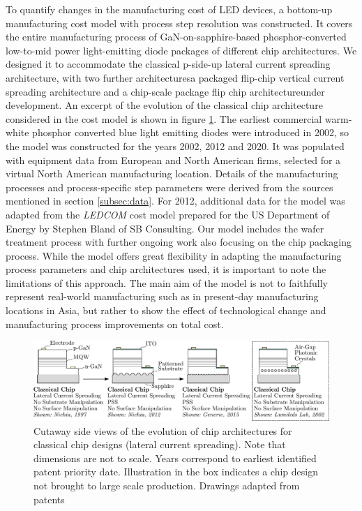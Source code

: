 \documentclass[a4paper,nocompress]{spie}  %
\begin{document}
        To quantify changes in the manufacturing cost of LED devices, a bottom-up manufacturing cost model with process step resolution was constructed. It covers the entire manufacturing process of GaN-on-sapphire-based phosphor-converted low-to-mid power light-emitting diode packages of different chip architectures. We designed it to accommodate the classical p-side-up lateral current spreading architecture, with two further architectures\textemdash a packaged flip-chip vertical current spreading architecture and a chip-scale package flip chip architecture\textemdash under development. An excerpt of the evolution of the classical chip architecture considered in the cost model is shown in figure \ref{fig:chip_arch}. The earliest commercial warm-white phosphor converted blue light emitting diodes were introduced in 2002, so the model was constructed for the years 2002, 2012 and 2020. It was populated with equipment data from European and North American firms, selected for a virtual North American manufacturing location. Details of the manufacturing processes and process-specific step parameters were derived from the sources mentioned in section \ref{subsec:data}. For 2012, additional data for the model was adapted from the \textit{LEDCOM} cost model prepared for the US Department of Energy by Stephen Bland of SB Consulting\cite{ledcomv2}. Our model includes the wafer treatment process with further ongoing work also focusing on the chip packaging process. While the model offers great flexibility in adapting the manufacturing process parameters and chip architectures used, it is important to note the limitations of this approach. The main aim of the model is not to faithfully represent real-world manufacturing such as in present-day manufacturing locations in Asia, but rather to show the effect of technological change and manufacturing process improvements on total cost. 

        \begin{figure} [ht]
            \begin{center}
                \includegraphics[width=\textwidth]{chip_architectures.pdf}
            \end{center}
            \caption{Cutaway side views of the evolution of chip architectures for classical chip designs (lateral current spreading). Note that dimensions are not to scale. Years correspond to earliest identified patent priority date. Illustration in the box indicates a chip design not brought to large scale production. Drawings adapted from patents \cite{nagahama2013nitride,tanaka2010semiconductor,wierer2006photonic}}
            \label{fig:chip_arch}
        \end{figure}
\end{document}
